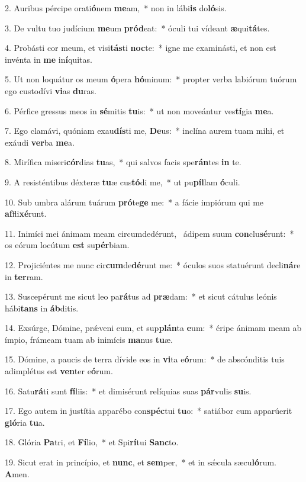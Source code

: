 2. Auribus pércipe orati\textbf{ó}nem \textbf{me}am,~*  non in lábi\textbf{is} do\textbf{ló}sis.\

3. De vultu tuo judícium \textbf{me}um \textbf{pród}eat:~*  óculi tui vídeant \textbf{æ}qui\textbf{tá}tes.\

4. Probásti cor meum, et visi\textbf{tás}ti \textbf{noc}te:~*  igne me examinásti, et non est invénta in \textbf{me} in\textbf{í}quitas.\

5. Ut non loquátur os meum \textbf{ó}pera \textbf{hó}minum:~*  propter verba labiórum tuórum ego custodívi \textbf{vi}as \textbf{du}ras.\

6. Pérfice gressus meos in \textbf{sé}mitis \textbf{tu}is:~*  ut non moveántur ves\textbf{tí}gia \textbf{me}a.\

7. Ego clamávi, quóniam exau\textbf{dís}ti me, \textbf{De}us:~*  inclína aurem tuam mihi, et exáudi \textbf{ver}ba \textbf{me}a.\

8. Mirífica miseri\textbf{cór}dias \textbf{tu}as,~*  qui salvos facis spe\textbf{rán}tes \textbf{in} te.\

9. A resisténtibus déxteræ \textbf{tu}æ cus\textbf{tó}di me,~*  ut pu\textbf{píl}lam \textbf{ó}culi.\

10. Sub umbra alárum tuárum \textbf{pró}te\textbf{ge} me:~*  a fácie impiórum qui me \textbf{af}fli\textbf{xé}runt.\

11. Inimíci mei ánimam meam circumdedérunt, \dag\  ádipem suum \textbf{con}clu\textbf{sé}runt:~*  os eórum locútum \textbf{est} su\textbf{pér}biam.\

12. Projiciéntes me nunc cir\textbf{cum}de\textbf{dé}runt me:~*  óculos suos statuérunt decli\textbf{ná}re in \textbf{ter}ram.\

13. Suscepérunt me sicut leo pa\textbf{rá}tus ad \textbf{præ}dam:~*  et sicut cátulus leónis hábi\textbf{tans} in \textbf{áb}ditis.\

14. Exsúrge, Dómine, prǽveni eum, et sup\textbf{plán}ta \textbf{e}um:~*  éripe ánimam meam ab ímpio, frámeam tuam ab inimícis \textbf{ma}nus \textbf{tu}æ.\

15. Dómine, a paucis de terra dívide eos in \textbf{vi}ta e\textbf{ó}rum:~*  de abscónditis tuis adimplétus est \textbf{ven}ter e\textbf{ó}rum.\

16. Satu\textbf{rá}ti sunt \textbf{fí}liis:~*  et dimisérunt relíquias suas \textbf{pár}vulis \textbf{su}is.\

17. Ego autem in justítia apparébo con\textbf{spéc}tui \textbf{tu}o:~*  satiábor cum apparúerit \textbf{gló}ria \textbf{tu}a.\

18. Glória \textbf{Pa}tri, et \textbf{Fí}lio,~*  et Spi\textbf{rí}tui \textbf{Sanc}to.\

19. Sicut erat in princípio, et \textbf{nunc}, et \textbf{sem}per,~*  et in sǽcula sæcu\textbf{ló}rum. \textbf{A}men.\

